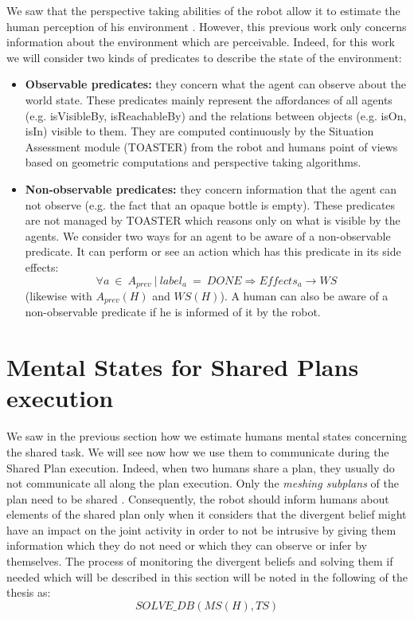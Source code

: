 \documentclass[english,a4paper,11pt,twoside]{StyleThese}
\begin{document}
We saw that the perspective taking abilities of the robot allow it to estimate the human perception of his environment \cite{milliez2014framework}. However, this previous work only concerns information about the environment which are perceivable. Indeed, for this work we will consider two kinds of predicates to describe the state of the environment:
\begin{itemize}
\item \textbf{Observable predicates:} they concern what the agent can observe about the world state. These predicates mainly represent the affordances of all agents (e.g. isVisibleBy, isReachableBy) and the relations between objects (e.g. isOn, isIn) visible to them. They are computed continuously by the Situation Assessment module (TOASTER) from the robot and humans point of views based on geometric computations and perspective taking algorithms.
\item \textbf{Non-observable predicates:} they concern information that the agent can not observe (e.g. the fact that an opaque bottle is empty). These predicates are not managed by TOASTER which reasons only on what is visible by the agents. We consider two ways for an agent to be aware of a non-observable predicate. It can perform or see an action which has this predicate in its side effects:
$$\forall a \ \in \ A_{prev} \ | \ label_{a} \ = \ DONE \Rightarrow Effects_{a} \rightarrow WS$$
(likewise with $A_{prev}(H)$ and $WS(H)$). A human can also be aware of a non-observable predicate if he is informed of it by the robot.
\end{itemize}


\section{Mental States for Shared Plans execution}

We saw in the previous section how we estimate humans mental states concerning the shared task. We will see now how we use them to communicate during the Shared Plan execution. Indeed, when two humans share a plan, they usually do not communicate all along the plan execution. Only the \textit{meshing subplans} of the plan need to be shared \cite{bratman1993shared}. Consequently, the robot should inform humans about elements of the shared plan only when it considers that the divergent belief might have an impact on the joint activity in order to not be intrusive by giving them information which they do not need or which they can observe or infer by themselves. The process of monitoring the divergent beliefs and solving them if needed which will be described in this section will be noted in the following of the thesis as:
$$SOLVE\_DB(MS(H), TS)$$
\end{document}
